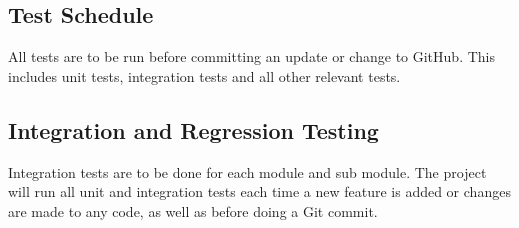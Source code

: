 \subsection{Test Schedule}

All tests are to be run before committing an update or change to GitHub. This includes unit tests, integration tests and all other relevant tests.



\subsection{Integration and Regression Testing}

Integration tests are to be done for each module and sub module.
The project will run all unit and integration tests each time a new feature is added or changes are made to any code, as well as before doing a Git commit.



